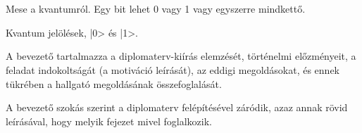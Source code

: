 \chapter{\bevezetes}

Mese a kvantumról. Egy bit lehet 0 vagy 1 vagy egyszerre mindkettő.

Kvantum jelölések, |0> és |1>.


A bevezető tartalmazza a diplomaterv-kiírás elemzését, történelmi előzményeit,
a feladat indokoltságát (a motiváció leírását), az eddigi megoldásokat, és
ennek tükrében a hallgató megoldásának összefoglalását.

A bevezető szokás szerint a diplomaterv felépítésével záródik, azaz annak
rövid leírásával, hogy melyik fejezet mivel foglalkozik.
